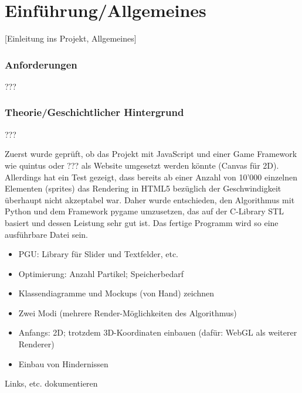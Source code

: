 
\chapter{Einführung/Allgemeines}

[Einleitung ins Projekt, Allgemeines]


\subsection{Anforderungen}

???


\subsection{Theorie/Geschichtlicher Hintergrund} 


???


\vspace*{1cm}

Zuerst wurde geprüft, ob das Projekt mit JavaScript und einer Game Framework wie quintus oder ??? als Website umgesetzt werden könnte (Canvas für 2D). Allerdings hat ein Test gezeigt, dass bereits ab einer Anzahl von 10'000 einzelnen Elementen (sprites) das Rendering in HTML5 bezüglich der Geschwindigkeit überhaupt nicht akzeptabel war. Daher wurde entschieden, den Algorithmus mit Python und dem Framework pygame umzusetzen, das auf der C-Library STL basiert und dessen Leistung sehr gut ist. Das fertige Programm wird so eine ausführbare Datei sein.


\vspace*{1cm} 

\begin{itemize}[noitemsep]
\item PGU: Library für Slider und Textfelder, etc.
\item Optimierung: Anzahl Partikel; Speicherbedarf
\item Klassendiagramme und Mockups (von Hand) zeichnen
\item Zwei Modi (mehrere Render-Möglichkeiten des Algorithmus)
\item Anfangs: 2D; trotzdem 3D-Koordinaten einbauen (dafür: WebGL als weiterer Renderer)
\item Einbau von Hindernissen
\end{itemize}


Links, etc. dokumentieren


\vspace*{1cm}
